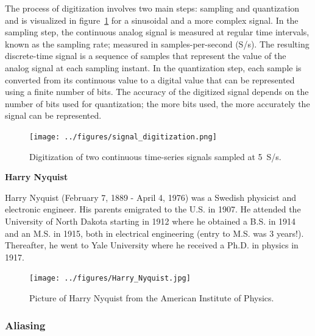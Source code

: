 \documentclass[12pt,letter]{article}
\begin{document}
The process of digitization involves two main steps: sampling and quantization and is visualized in figure~\ref{fig:signal_digitization} for a sinusoidal and a more complex signal. In the sampling step, the continuous analog signal is measured at regular time intervals, known as the sampling rate; measured in samples-per-second (S/s). The resulting discrete-time signal is a sequence of samples that represent the value of the analog signal at each sampling instant. In the quantization step, each sample is converted from its continuous value to a digital value that can be represented using a finite number of bits. The accuracy of the digitized signal depends on the number of bits used for quantization; the more bits used, the more accurately the signal can be represented.



\begin{figure}[H]
    \centering
    \texttt{[image: ../figures/signal\_digitization.png]}
    \caption{Digitization of two continuous time-series signals sampled at 5~S/s.}
    \label{fig:signal_digitization}
\end{figure}

\pagebreak

	\begin{review}
	\label{sec:Harry_Nyquist}
		
		\textbf{Harry Nyquist}

		\noindent Harry Nyquist (February 7, 1889 - April 4, 1976) was a Swedish physicist and electronic engineer. His parents emigrated to the U.S. in 1907.  He attended the University of North Dakota starting in 1912 where he obtained a B.S. in 1914 and an M.S. in 1915, both in electrical engineering (entry to M.S. was 3 years!). Thereafter, he went to Yale University where he received a Ph.D. in physics in 1917.

		\begin{figure}[H]
			\centering
			\texttt{[image: ../figures/Harry\_Nyquist.jpg]}
			\caption{Picture of Harry Nyquist from the American Institute of Physics.\protect\footnotemark[1]}
			\label{fig:Harry_Nyquist}
		\end{figure}
	\end{review}
	
\pagebreak
\subsubsection{Aliasing}
\end{document}
